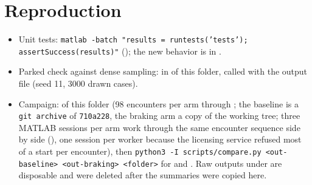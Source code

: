 \documentclass[11pt]{article}
\begin{document}
\section{Reproduction}
\begin{itemize}
\item Unit tests: \texttt{matlab -batch "results = runtests('tests'); assertSuccess(results)"}
  (); the new behavior is in .
\item Parked check against dense sampling:  in
   of this folder, called with the output file
  (seed 11, 3000 drawn cases).
\item Campaign:  of this folder (98 encounters
  per arm through ; the baseline is a
  \texttt{git archive} of \texttt{710a228}, the braking arm a copy of the
  working tree; three MATLAB sessions per arm work through the same encounter
  sequence side by side (), one session per worker
  because the licensing service refused most of a start per encounter), then
  \texttt{python3 -I scripts/compare.py <out-baseline> <out-braking> <folder>}
  for  and . Raw outputs under
   are
  disposable and were deleted after the summaries were copied here.
\end{itemize}
\end{document}
